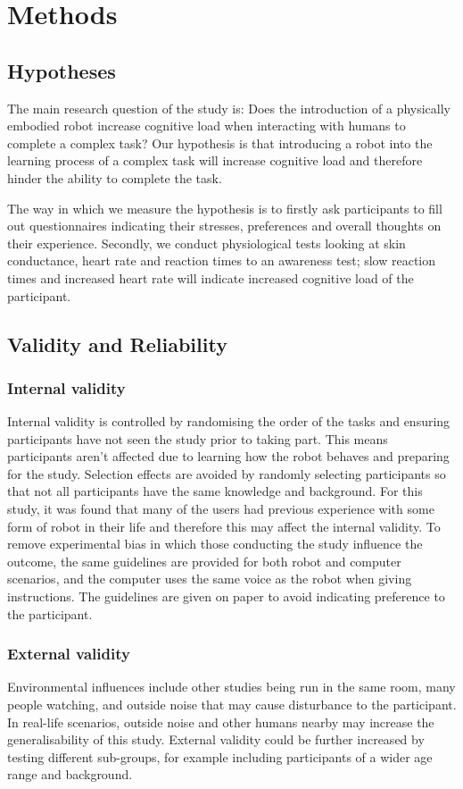 \documentclass[conference]{IEEEtran}
\begin{document}
\section{Methods}

\subsection{Hypotheses}
The main research question of the study is: Does the introduction of a physically embodied robot increase cognitive load when interacting with humans to complete a complex task? Our hypothesis is that introducing a robot into the learning process of a complex task will increase cognitive load and therefore hinder the ability to complete the task.

The way in which we measure the hypothesis is to firstly ask participants to fill out questionnaires indicating their stresses, preferences and overall thoughts on their experience. Secondly, we conduct physiological tests looking at skin conductance, heart rate and reaction times to an awareness test; slow reaction times and increased heart rate will indicate increased cognitive load of the participant. 

\subsection{Validity and  Reliability}

\subsubsection{Internal validity} 
Internal validity is controlled by randomising the order of the tasks and ensuring participants have not seen the study prior to taking part. This means participants aren't affected due to learning how the robot behaves and preparing for the study. Selection effects are avoided by randomly selecting participants so that not all participants have the same knowledge and background. For this study, it was found that many of the users had previous experience with some form of robot in their life and therefore this may affect the internal validity. To remove experimental bias in which those conducting the study influence the outcome, the same guidelines are provided for both robot and computer scenarios, and the computer uses the same voice as the robot when giving instructions. The guidelines are given on paper to avoid indicating preference to the participant.

\subsubsection{External validity}
Environmental influences include other studies being run in the same room, many people watching, and outside noise that may cause disturbance to the participant. In real-life scenarios, outside noise and other humans nearby may increase the generalisability of this study. External validity could be further increased by testing different sub-groups, for example including participants of a wider age range and background.
\end{document}
